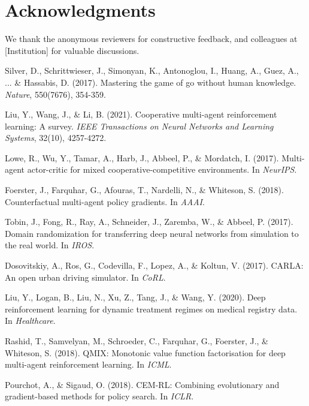 \documentclass[12pt, a4paper]{article}
\begin{document}
\section*{Acknowledgments}
We thank the anonymous reviewers for constructive feedback, and colleagues at [Institution] for valuable discussions.


\begin{thebibliography}{99}

Silver, D., Schrittwieser, J., Simonyan, K., Antonoglou, I., Huang, A., Guez, A., ... \& Hassabis, D. (2017). Mastering the game of go without human knowledge. \textit{Nature}, 550(7676), 354-359.

Liu, Y., Wang, J., \& Li, B. (2021). Cooperative multi-agent reinforcement learning: A survey. \textit{IEEE Transactions on Neural Networks and Learning Systems}, 32(10), 4257-4272.

Lowe, R., Wu, Y., Tamar, A., Harb, J., Abbeel, P., \& Mordatch, I. (2017). Multi-agent actor-critic for mixed cooperative-competitive environments. In \textit{NeurIPS}.

Foerster, J., Farquhar, G., Afouras, T., Nardelli, N., \& Whiteson, S. (2018). Counterfactual multi-agent policy gradients. In \textit{AAAI}.

Tobin, J., Fong, R., Ray, A., Schneider, J., Zaremba, W., \& Abbeel, P. (2017). Domain randomization for transferring deep neural networks from simulation to the real world. In \textit{IROS}.

Dosovitskiy, A., Ros, G., Codevilla, F., Lopez, A., \& Koltun, V. (2017). CARLA: An open urban driving simulator. In \textit{CoRL}.

Liu, Y., Logan, B., Liu, N., Xu, Z., Tang, J., \& Wang, Y. (2020). Deep reinforcement learning for dynamic treatment regimes on medical registry data. In \textit{Healthcare}.

Rashid, T., Samvelyan, M., Schroeder, C., Farquhar, G., Foerster, J., \& Whiteson, S. (2018). QMIX: Monotonic value function factorisation for deep multi-agent reinforcement learning. In \textit{ICML}.

Pourchot, A., \& Sigaud, O. (2018). CEM-RL: Combining evolutionary and gradient-based methods for policy search. In \textit{ICLR}.


\end{thebibliography}
\end{document}
